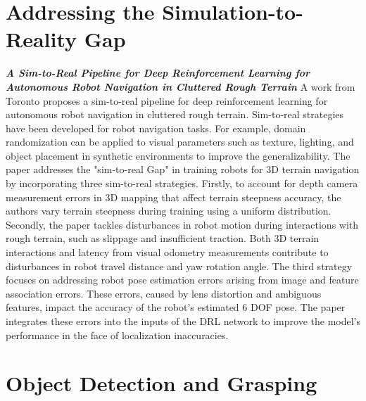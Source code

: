 \onehalfspacing


\section{Addressing the Simulation-to-Reality Gap}

\textbf{\textit{A Sim-to-Real Pipeline for Deep Reinforcement
		Learning for Autonomous Robot Navigation in
		Cluttered Rough Terrain}} \quad
A work from Toronto \cite{zhang2021simtoreal} proposes a sim-to-real pipeline for
deep reinforcement learning for autonomous robot navigation in cluttered rough terrain.
Sim-to-real strategies have been developed for robot navigation tasks. For example,
domain randomization can be applied to visual parameters such as texture,
lighting, and object placement in synthetic environments to improve the generalizability.
The paper \cite{zhang2021simtoreal} addresses the "sim-to-real Gap" in training robots for
3D terrain navigation by incorporating three sim-to-real strategies. Firstly, to account
for depth camera measurement errors in 3D mapping that affect terrain steepness accuracy,
the authors vary terrain steepness during training using a uniform distribution.
Secondly, the paper tackles disturbances in robot motion during interactions with rough
terrain, such as slippage and insufficient traction. Both 3D terrain interactions and
latency from visual odometry measurements contribute to disturbances in robot travel distance
and yaw rotation angle. The third strategy focuses on addressing robot pose estimation errors
arising from image and feature association errors. These errors, caused by lens distortion
and ambiguous features, impact the accuracy of the robot's estimated 6 DOF pose.
The paper integrates these errors into the inputs of the DRL network to improve the
model's performance in the face of localization inaccuracies.



\section{Object Detection and Grasping}

